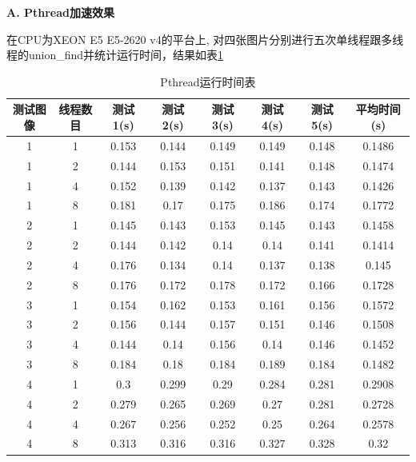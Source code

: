 \documentclass[a4paper, 11pt]{article}
\begin{document}
\textbf{A. Pthread加速效果}

在CPU为XEON E5 E5-2620 v4的平台上, 对四张图片分别进行五次单线程跟多线程的union\_find并统计运行时间，结果如表\ref{tb:pthread}
\begin{table}[H]
	\centering
    \begin{tabular}{cccccccc}
    \hline
    测试图像   & 线程数目 & 测试1(s) & 测试2(s) & 测试3(s) & 测试4(s) & 测试5(s) & 平均时间(s) \\ \hline
    1 & 1    & 0.153  & 0.144  & 0.149  & 0.149  & 0.148  & 0.1486    \\ \hline
    1 & 2    & 0.144  & 0.153  & 0.151  & 0.141  & 0.148  & 0.1474    \\ \hline
    1 & 4    & 0.152  & 0.139  & 0.142  & 0.137  & 0.143  & 0.1426    \\ \hline
    1 & 8    & 0.181  & 0.17   & 0.175  & 0.186  & 0.174  & 0.1772    \\ \hline
    2 & 1    & 0.145  & 0.143  & 0.153  & 0.145  & 0.143  & 0.1458    \\ \hline
    2 & 2    & 0.144  & 0.142  & 0.14   & 0.14   & 0.141  & 0.1414    \\ \hline
    2 & 4    & 0.176  & 0.134  & 0.14   & 0.137  & 0.138  & 0.145     \\ \hline
    2 & 8    & 0.176  & 0.172  & 0.178  & 0.172  & 0.166  & 0.1728    \\ \hline
    3 & 1    & 0.154  & 0.162  & 0.153  & 0.161  & 0.156  & 0.1572    \\ \hline
    3 & 2    & 0.156  & 0.144  & 0.157  & 0.151  & 0.146  & 0.1508    \\ \hline
    3 & 4    & 0.144  & 0.14   & 0.156  & 0.14   & 0.146  & 0.1452    \\ \hline
    3 & 8    & 0.184  & 0.18   & 0.184  & 0.189  & 0.184  & 0.1482    \\ \hline
    4 & 1    & 0.3    & 0.299  & 0.29   & 0.284  & 0.281  & 0.2908    \\ \hline
    4 & 2    & 0.279  & 0.265  & 0.269  & 0.27   & 0.281  & 0.2728    \\ \hline
    4 & 4    & 0.267  & 0.256  & 0.252  & 0.25   & 0.264  & 0.2578    \\ \hline
    4 & 8    & 0.313  & 0.316  & 0.316  & 0.327  & 0.328  & 0.32      \\ \hline
    \end{tabular}
    \caption{Pthread运行时间表}
    \label{tb:pthread}
\end{table}
\end{document}
